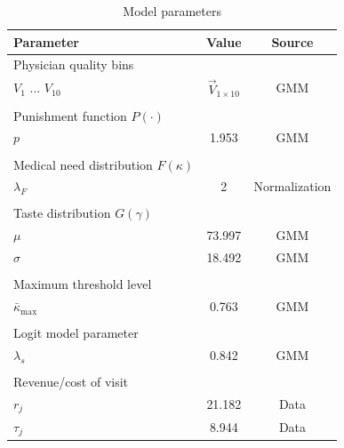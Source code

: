 \documentclass[../main.tex]{subfiles}
\begin{document}
\newpage

\begin{table}[h]
    \centering
    \small
    \begin{tabular}{lcc}
        \toprule
        Parameter  & Value & Source \\
        \midrule
        Physician quality bins && \\
        \hspace{1em}$V_1$ ... $V_{10}$ & $\vec{V}_{1 \times 10}$ & GMM \\
            \\
        Punishment function $P(\cdot)$ && \\
            \hspace{1em}$p$ & 1.953 &  GMM\\
            \\
        Medical need distribution $F(\kappa)$ && \\
            \hspace{1em}$\lambda_F$ & 2 & \hspace{0.25em} Normalization\\
            \\
        Taste distribution $G(\gamma)$ \\
            \hspace{1em}$\mu$ & 73.997 &  GMM\\
            \hspace{1em}$\sigma$ & 18.492 &  GMM\\
            \\
        Maximum threshold level && \\
            \hspace{1em}$\bar{\kappa}_{\max}$ & 0.763 &  GMM\\
            \\
        Logit model parameter && \\
            \hspace{1em}$\lambda_s$ & 0.842 & GMM\\
            \\
        Revenue/cost of visit && \\
            \hspace{1em}$r_j$ & 21.182 & Data \\
            \hspace{1em}$\tau_j$ & 8.944 & Data \\
        \bottomrule 
    \end{tabular}
    \caption{Model parameters}
    \end{table}
    
\end{document}

